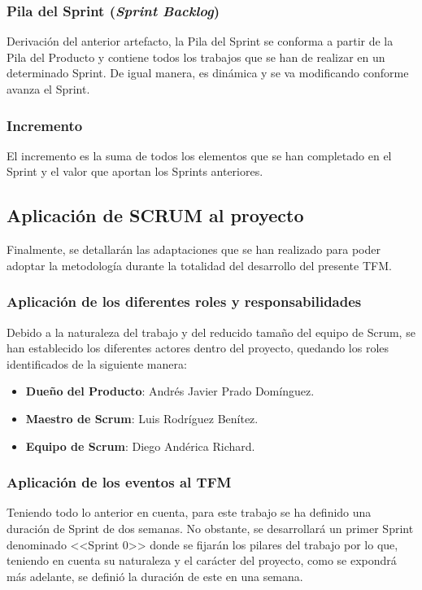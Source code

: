 \subsubsection{Pila del Sprint (\textit{Sprint Backlog})}
Derivación del anterior artefacto, la Pila del Sprint se conforma a partir de la Pila del Producto y contiene todos los trabajos que se han de realizar en un determinado Sprint. De igual manera, es dinámica y se va modificando conforme avanza el Sprint.

\subsubsection{Incremento}
El incremento es la suma de todos los elementos que se han completado en el Sprint y el valor que aportan los Sprints anteriores.

\clearpage

\subsection{Aplicación de SCRUM al proyecto}
Finalmente, se detallarán las adaptaciones que se han realizado para poder adoptar la metodología durante la totalidad del desarrollo del presente \acs{TFM}.

\subsubsection{Aplicación de los diferentes roles y responsabilidades}
Debido a la naturaleza del trabajo y del reducido tamaño del equipo de Scrum, se han establecido los diferentes actores dentro del proyecto, quedando los roles identificados de la siguiente manera:

\begin{itemize}
    \item \textbf{Dueño del Producto}: Andrés Javier Prado Domínguez.
    \item \textbf{Maestro de Scrum}: Luis Rodríguez Benítez.
    \item \textbf{Equipo de Scrum}: Diego Andérica Richard.
\end{itemize}

\subsubsection{Aplicación de los eventos al \acs{TFM}}
Teniendo todo lo anterior en cuenta, para este trabajo se ha definido una duración de Sprint de dos semanas. No obstante, se desarrollará un primer Sprint denominado <<Sprint 0>> donde se fijarán los pilares del trabajo por lo que, teniendo en cuenta su naturaleza y el carácter del proyecto, como se expondrá más adelante, se definió la duración de este en una semana.

